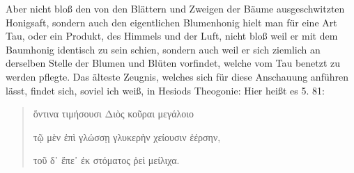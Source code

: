 \documentclass[a4paper, 11pt, oneside]{article}
\begin{document}
Aber nicht bloß den von den Blättern und Zweigen der Bäume ausgeschwitzten Honigsaft, sondern auch den eigentlichen Blumenhonig hielt man für eine Art Tau, oder ein Produkt, des Himmels und der Luft, nicht bloß weil er mit dem Baumhonig identisch zu sein schien, sondern auch weil er sich ziemlich an derselben Stelle der Blumen und Blüten vorfindet, welche vom Tau benetzt zu werden pflegte. Das älteste Zeugnis, welches sich für diese Anschauung anführen lässt, findet sich, soviel ich weiß, in Hesiods Theogonie: Hier heißt es 5. 81:
\begin{quotation}
ὅντινα τιμήσουσι Διὸς κοῦραι μεγάλοιο

τῷ μὲν ἐπὶ γλώσσῃ γλυκερὴν χείουσιν ἐέρσην,

τοῦ δ᾽ ἔπε᾽ ἐκ στόματος ῥεὶ μείλιχα.
\end{quotation}
\paragraph{}
\end{document}
